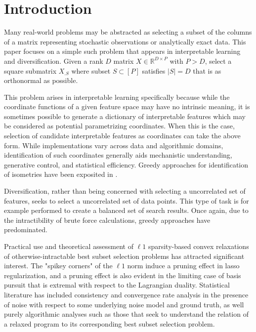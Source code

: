 \section{Introduction}
\label{sec:introduction}

Many real-world problems may be abstracted as selecting a subset of the columns of a matrix representing stochastic observations or analytically exact data.
This paper focuses on a simple such problem that appears in interpretable learning and diversification.
Given a rank $D$ matrix $ X \in \mathbb R^{D \times P}$ with $P > D$, select a square submatrix $ X_{. S}$ where subset $ S \subset [P]$ satisfies $| S| = D$ that is as orthonormal as possible.

This problem arises in interpretable learning specifically because while the coordinate functions of a given feature space may have no intrinsic meaning, it is sometimes possible to generate a dictionary of interpretable features which may be considered as potential parametrizing coordinates.
When this is the case, selection of candidate interpretable features as coordinates can take the above form.
While implementations vary across data and algorithmic domains, identification of such coordinates generally aids mechanistic understanding, generative control, and statistical efficiency.
Greedy approaches for identification of isometries have been exposited in \citet{5895106, NEURIPS2019_6a10bbd4, Kohli2021-lr, Jones2007-uc}.

Diversification, rather than being concerned with selecting a uncorrelated set of features, seeks to select a uncorrelated set of data points.
This type of task is for example performed to create a balanced set of search results.
Once again, due to the intractibility of brute force calculations, greedy approaches have predominated.

Practical use and theoretical assessment of $\ell 1$ sparsity-based convex relaxations of otherwise-intractable best subset selection problems has attracted significant interest.
The "spikey corners" of the $\ell 1$ norm induce a pruning effect in lasso regularization, and a pruning effect is also evident in the limiting case of basis pursuit that is extremal with respect to the Lagrangian duality.
Statistical literature has included consistency and convergence rate analysis in the presence of noise with respect to some underlying noise model and ground truth, as well purely algorithmic analyses such as those that seek to understand the relation of a relaxed program to its corresponding best subset selection problem.


